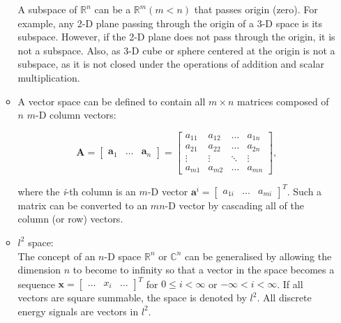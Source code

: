 \documentclass[10pt,b5paper,titlepage]{book}
\begin{document}
\begin{itemize}
\begin{itemize}
                A subspace of $\mathbb{R}^{n}$ can be a $\mathbb{R}^{m} (m < n)$
                that passes origin (zero). For example, any 2-D plane passing
                through the origin of a 3-D space is its subspace. However, if
                the 2-D plane does not pass through the origin, it is not a subspace.
                Also, as 3-D cube or sphere centered at the origin is not a subspace,
                as it is not closed under the operations of addition and scalar
                multiplication.

            \item A vector space can be defined to contain all $m \times n$ matrices
                composed of $n$ $m$-D column vectors:

                \begin{equation}
                    \mathbf{A} = \begin{bmatrix} \mathbf{a}_1 & \ldots & \mathbf{a}_n \end{bmatrix}
                    = \begin{bmatrix}
                        a_{11} & a_{12} & \ldots & a_{1n}\\
                        a_{21} & a_{22} & \ldots & a_{2n}\\
                        \vdots & \vdots & \ddots & \vdots\\
                        a_{m1} & a_{m2} & \ldots & a_{mn}
                    \end{bmatrix}
                ,\end{equation}

                where the \textit{i}-th column is an  $m$-D vector
                $\mathbf{a}^{i} = \begin{bmatrix} a_{1i} & \ldots & a_{mi} \end{bmatrix}^{T}$.
                Such a matrix can be converted to an $mn$-D vector by cascading all of the column
                (or row) vectors.

            \item  $l^{2}$ space:\\

                The concept of an $n$-D space  $\mathbb{R}^{n}$ or $\mathbb{C}^{n}$
                can be generalised by allowing the dimension $n$ to become to
                infinity so that a vector in the space becomes a sequence
                $\mathbf{x} = \begin{bmatrix} \ldots & x_{i} & \ldots \end{bmatrix}^{T}$
                for $0 \le i < \infty$ or $-\infty < i < \infty$. If all vectors
                are square summable, the space is denoted by $l^{2}$. All discrete energy
                signals are vectors in $l^{2}$.


\end{itemize}
\end{itemize}
\end{document}
